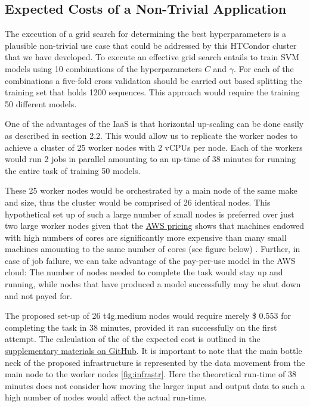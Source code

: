 \documentclass{article}
\begin{document}
\subsection{Expected Costs of a Non-Trivial Application} %
The execution of a grid search for determining the best hyperparameters is a plausible non-trivial use case that could be addressed by this HTCondor cluster that we have developed.
To execute an effective grid search entails to train SVM models using 10 combinations of the hyperparameters $C$ and $\gamma$.
For each of the combinations a five-fold cross validation should be carried out based splitting the training set that holds 1200 sequences.
This approach would require the training 50 different models.

One of the advantages of the IaaS is that horizontal up-scaling can be done easily as described in section 2.2.
This would allow us to replicate the worker nodes to achieve a cluster of 25 worker nodes with 2 vCPUs per node. 
Each of the workers would run 2 jobs in parallel amounting to an up-time of 38 minutes for running the entire task of training 50 models.

These 25 worker nodes would be orchestrated by a main node of the same make and size, thus the cluster would be comprised of 26 identical nodes.
This hypothetical set up of such a large number of small nodes is preferred over just two large worker nodes given that the \href{https://aws.amazon.com/ec2/pricing/on-demand/}{AWS pricing} 
shows that machines endowed with high numbers of cores are significantly more expensive than many small machines amounting to the same number of cores (see figure below) \cite{noauthor_ec2_nodate}.
Further, in case of job failure, we can take advantage of the pay-per-use model in the AWS cloud: The number of nodes needed to complete the task would stay up and running, while nodes that have produced a model successfully may be shut down and not payed for.

The proposed set-up of 26 t4g.medium nodes would require merely \$ 0.553 for completing the task in 38 minutes, provided it ran successfully on the first attempt.
The calculation of the of the expected cost is outlined in the \href{https://github.com/ilante/BDP-projcect-aws-main/blob/main/stats/HTcondor_stats.ipynb}{supplementary materials on GitHub}.
It is important to note that the main bottle neck of the proposed infrastructure is represented by the data movement from the main node to the worker nodes \ref{fig:infrastr}.
Here the theoretical run-time of 38 minutes does not consider how moving the larger input and output data to such a high number of nodes would affect the actual run-time.
\end{document}
